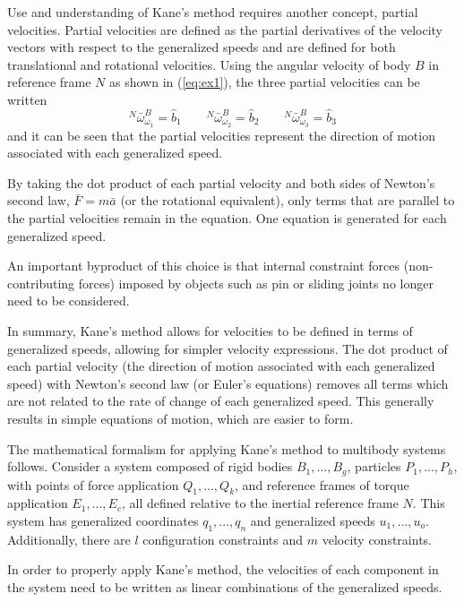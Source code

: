 \documentclass[smallcondensed,final]{svjour3}                     %
\begin{document}
Use and understanding of Kane's method requires another concept, partial
velocities.
Partial velocities are defined as the partial derivatives of the velocity
vectors with respect to the generalized speeds and are defined for both
translational and rotational velocities.
Using the angular velocity of body $B$ in reference frame $N$ as shown in
(\ref{eq:ex1}), the three partial velocities can be written
\[
{^N}\bar{\omega}^B_{\omega_1} = \hat{b}_1 \quad \quad
{^N}\bar{\omega}^B_{\omega_2} = \hat{b}_2 \quad \quad
{^N}\bar{\omega}^B_{\omega_3} = \hat{b}_3
\]
and it can be seen that the partial velocities represent the direction of
motion associated with each generalized speed.

By taking the dot product of each partial velocity and both sides of Newton's
second law, $\bar{F}=m\bar{a}$ (or the rotational equivalent), only terms that
are parallel to the partial velocities remain in the equation.
One equation is generated for each generalized speed.

An important byproduct of this choice is that internal constraint forces
(non-contributing forces) imposed by objects such as pin or sliding joints
no longer need to be considered.

In summary, Kane's method allows for velocities to be defined in terms of
generalized speeds, allowing for simpler velocity expressions.
The dot product of each partial velocity (the direction of motion associated
with each generalized speed) with Newton's second law (or Euler's equations)
removes all terms which are not related to the rate of change of each
generalized speed.
This generally results in simple equations of motion, which are easier to form.

The mathematical formalism for applying Kane's method to multibody systems
follows.
Consider a system composed of rigid bodies $B_1,...,B_g$, particles
$P_1,...,P_h$, with points of force application $Q_1,...,Q_k$, and reference
frames of torque application $E_1,...,E_c$, all defined relative to the
inertial reference frame $N$.
This system has generalized coordinates $q_1,...,q_n$ and generalized speeds
$u_1,...,u_o$.
Additionally, there are $l$ configuration constraints and $m$ velocity
constraints.

In order to properly apply Kane's method, the velocities of each component in
the system need to be written as linear combinations of the generalized speeds.
\end{document}
